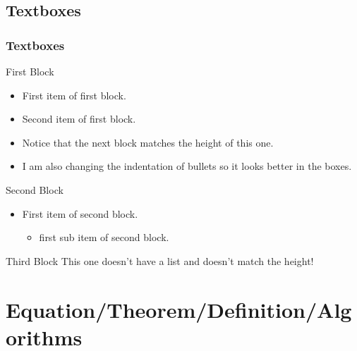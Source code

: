 \documentclass[
	10pt, %
	aspectratio=169, %
]{beamer}
\begin{document}
\subsection{Textboxes}
\begin{frame}
	\frametitle{Textboxes}
	\centering
	\begin{minipage}{0.3\linewidth}
		\begin{primaryblock}[equal height group=A,label=block:first]{First Block}
			\setlength{\leftmargini}{8pt}
			\begin{itemize}
				\item First item of first block.
				\item Second item of first block.
				\item Notice that the next block matches the height of this one.
				\item I am also changing the indentation of bullets so it looks better in the boxes.
			\end{itemize}
		\end{primaryblock}
	\end{minipage}
	\begin{minipage}{0.3\linewidth}
		\begin{secondaryblock}[equal height group=A]{Second Block}
			\setlength{\leftmargini}{8pt}
			\begin{itemize}
				\item First item of second block.
				      \begin{itemize}
					      \item first sub item of second block.
				      \end{itemize}
			\end{itemize}
		\end{secondaryblock}
	\end{minipage}
	\begin{minipage}{0.3\linewidth}
		\begin{primaryblock}[]{Third Block}
			This one doesn't have a list and doesn't match the height!
		\end{primaryblock}
	\end{minipage}
\end{frame}

\section{Equation/Theorem/Definition/Algorithms}
\end{document}
